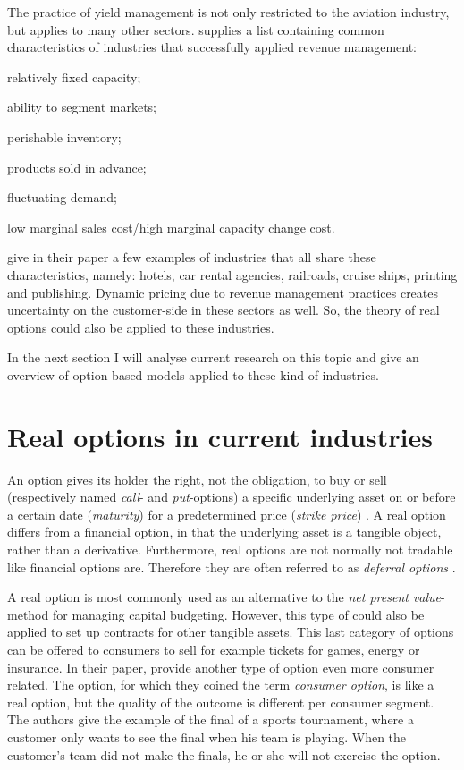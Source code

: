 The practice of yield management is not only restricted to the aviation industry, but applies to many other sectors.  supplies a list containing common characteristics of industries that successfully applied revenue management:
\begin{compactitem}
\item relatively fixed capacity;
\item ability to segment markets;
\item perishable inventory;
\item products sold in advance;
\item fluctuating demand;
\item low marginal sales cost/high marginal capacity change cost.
\vspace{1ex}
\end{compactitem}

 give in their paper a few examples of industries that all share these characteristics, namely: hotels, car rental agencies, railroads, cruise ships, printing and publishing. Dynamic pricing due to revenue management practices creates uncertainty on the customer-side in these sectors as well. So, the theory of real options could also be applied to these industries.

In the next section I will analyse current research on this topic and give an over\-view of option-based models applied to these kind of industries.

\section{Real options in current industries}
An option gives its holder the right, not the obligation, to buy or sell (respectively named \emph{call}- and \emph{put}-options) a specific underlying asset on or before a certain date (\emph{maturity}) for a predetermined price (\emph{strike price}) \cite{hull99}. A real option differs from a financial option, in that the underlying asset is a tangible object, rather than a derivative. Furthermore, real options are not normally not tradable like financial options are. Therefore they are often referred to as \emph{deferral options} \cite{jain11}.

A real option is most commonly used as an alternative to the \emph{net present value}-method for managing capital budgeting. However, this type of could also be applied to set up contracts for other tangible assets. This last category of options can be offered to consumers to sell for example tickets for games, energy or insurance. In their paper,  provide another type of option even more consumer related. The option, for which they coined the term \emph{consumer option}, is like a real option, but the quality of the outcome is different per consumer segment. The authors give the example of the final of a sports tournament, where a customer only wants to see the final when his team is playing. When the customer's team did not make the finals, he or she will not exercise the option.

